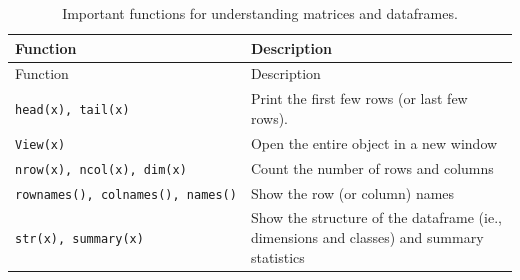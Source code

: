 \documentclass[]{book}
\theoremstyle{definition}
\theoremstyle{definition}
\theoremstyle{remark}
\begin{document}
\begin{longtable}[]{@{}ll@{}}
\caption{\label{tab:dataframefunctions} Important functions for
understanding matrices and dataframes.}\tabularnewline
\toprule
\begin{minipage}[b]{0.34\columnwidth}\raggedright\strut
Function\strut
\end{minipage} & \begin{minipage}[b]{0.41\columnwidth}\raggedright\strut
Description\strut
\end{minipage}\tabularnewline
\midrule
\endfirsthead
\toprule
\begin{minipage}[b]{0.34\columnwidth}\raggedright\strut
Function\strut
\end{minipage} & \begin{minipage}[b]{0.41\columnwidth}\raggedright\strut
Description\strut
\end{minipage}\tabularnewline
\midrule
\endhead
\begin{minipage}[t]{0.34\columnwidth}\raggedright\strut
\texttt{head(x),\ tail(x)}\strut
\end{minipage} & \begin{minipage}[t]{0.41\columnwidth}\raggedright\strut
Print the first few rows (or last few rows).\strut
\end{minipage}\tabularnewline
\begin{minipage}[t]{0.34\columnwidth}\raggedright\strut
\texttt{View(x)}\strut
\end{minipage} & \begin{minipage}[t]{0.41\columnwidth}\raggedright\strut
Open the entire object in a new window\strut
\end{minipage}\tabularnewline
\begin{minipage}[t]{0.34\columnwidth}\raggedright\strut
\texttt{nrow(x),\ ncol(x),\ dim(x)}\strut
\end{minipage} & \begin{minipage}[t]{0.41\columnwidth}\raggedright\strut
Count the number of rows and columns\strut
\end{minipage}\tabularnewline
\begin{minipage}[t]{0.34\columnwidth}\raggedright\strut
\texttt{rownames(),\ colnames(),\ names()}\strut
\end{minipage} & \begin{minipage}[t]{0.41\columnwidth}\raggedright\strut
Show the row (or column) names\strut
\end{minipage}\tabularnewline
\begin{minipage}[t]{0.34\columnwidth}\raggedright\strut
\texttt{str(x),\ summary(x)}\strut
\end{minipage} & \begin{minipage}[t]{0.41\columnwidth}\raggedright\strut
Show the structure of the dataframe (ie., dimensions and classes) and
summary statistics\strut
\end{minipage}\tabularnewline
\bottomrule
\end{longtable}
\end{document}
